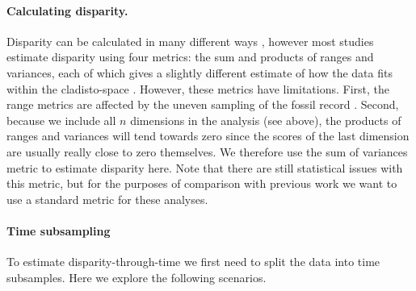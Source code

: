 \documentclass[12pt,a4paper]{article}
\begin{document}
\paragraph{Calculating disparity.}
Disparity can be calculated in many different ways \citep[e.g.][]{Wills1994,Ciampaglio2004,thorneresetting2011,hopkinsdecoupling2013,huang2015origins}, however most studies estimate disparity using four metrics: the sum and products of ranges and variances, each of which gives a slightly different estimate of how the data fits within the cladisto-space \citep{Foote01071994,Wills1994,brusatte50,Brusatte12092008,cisneros2010,thorneresetting2011,prentice2011,brusattedinosaur2012,toljagictriassic-jurassic2013,ruta2013,bentonmodels2014,bensonfaunal2014}.
However, these metrics have limitations. 
First, the range metrics are affected by the uneven sampling of the fossil record \citep{Butler2012}.
Second, because we include all $n$ dimensions in the analysis (see above), the products of ranges and variances will tend towards zero since the scores of the last dimension are usually really close to zero themselves. 
We therefore use the sum of variances metric to estimate disparity here.
Note that there are still statistical issues with this metric, but for the purposes of comparison with previous work we want to use a standard metric for these analyses.

\paragraph{Time subsampling} 
\label{time_subsamples}

To estimate disparity-through-time we first need to split the data into time subsamples.
Here we explore the following scenarios.
\end{document}
